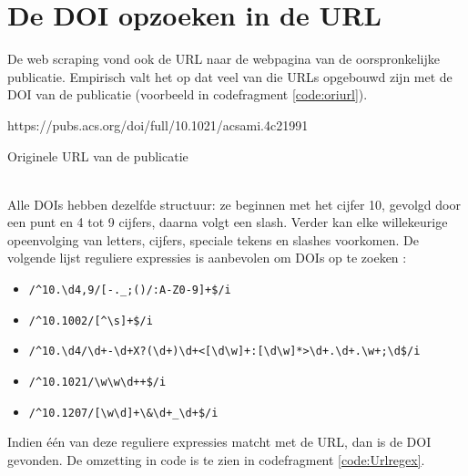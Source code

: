 \section{De DOI opzoeken in de URL}
\label{Doiurl}
De web scraping vond ook de URL naar de webpagina van de oorspronkelijke publicatie. Empirisch valt het op dat veel van die URLs opgebouwd zijn met de DOI van de publicatie (voorbeeld in codefragment \ref{code:oriurl}).
\begin{listing}
    https://pubs.acs.org/doi/full/10.1021/acsami.4c21991
    \caption[Originele URL van de publicatie]{Originele URL van de publicatie}
    \label{code:oriurl}
\end{listing}\\
Alle DOIs hebben dezelfde structuur: ze beginnen met het cijfer 10, gevolgd door een punt en 4 tot 9 cijfers, daarna volgt een slash. Verder kan elke willekeurige opeenvolging van letters, cijfers, speciale tekens en slashes voorkomen.
De volgende lijst reguliere expressies is aanbevolen om DOIs op te zoeken \textcite{CrossrefRegex2025}:
\begin{itemize}
    \item \texttt{/\textasciicircum10.\textbackslash d{4,9}/[-.\_;()/:A-Z0-9]+\$/i}
    \item \texttt{/\textasciicircum10.1002/[\textasciicircum\textbackslash s]+\$/i}
    \item \texttt{/\textasciicircum10.\textbackslash d{4}/\textbackslash d+-\textbackslash d+X?(\textbackslash d+)\textbackslash d+<[\textbackslash d\textbackslash w]+:[\textbackslash d\textbackslash w]*>\textbackslash d+.\textbackslash d+.\textbackslash w+;\textbackslash d\$/i}
    \item \texttt{/\textasciicircum10.1021/\textbackslash w\textbackslash w\textbackslash d++\$/i}
    \item \texttt{/\textasciicircum10.1207/[\textbackslash w\textbackslash d]+\textbackslash \&\textbackslash d+\_\textbackslash d+\$/i}
\end{itemize}
Indien één van deze reguliere expressies matcht met de URL, dan is de DOI gevonden.
De omzetting in code is te zien in codefragment \ref{code:Urlregex}.
